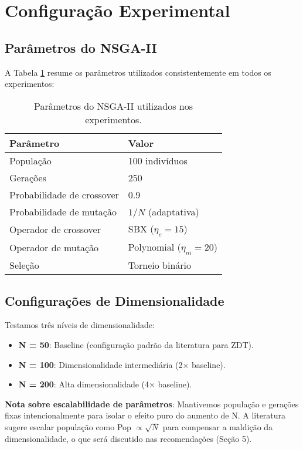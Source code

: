 \section{Configuração Experimental}

\subsection{Parâmetros do NSGA-II}
A Tabela \ref{tab:params} resume os parâmetros utilizados consistentemente em todos os experimentos:

\begin{table}[h]
\centering
\begin{tabular}{ll}
\toprule
\textbf{Parâmetro} & \textbf{Valor} \\
\midrule
População & 100 indivíduos \\
Gerações & 250 \\
Probabilidade de crossover & 0.9 \\
Probabilidade de mutação & $1/N$ (adaptativa) \\
Operador de crossover & SBX ($\eta_c = 15$) \\
Operador de mutação & Polynomial ($\eta_m = 20$) \\
Seleção & Torneio binário \\
\bottomrule
\end{tabular}
\caption{Parâmetros do NSGA-II utilizados nos experimentos.}
\label{tab:params}
\end{table}

\subsection{Configurações de Dimensionalidade}
Testamos três níveis de dimensionalidade:
\begin{itemize}
  \item \textbf{N = 50}: Baseline (configuração padrão da literatura para ZDT).
  \item \textbf{N = 100}: Dimensionalidade intermediária (2× baseline).
  \item \textbf{N = 200}: Alta dimensionalidade (4× baseline).
\end{itemize}

\textbf{Nota sobre escalabilidade de parâmetros}: Mantivemos população e gerações fixas intencionalmente para isolar o efeito puro do aumento de N. A literatura sugere escalar população como Pop $\propto \sqrt{N}$ para compensar a maldição da dimensionalidade, o que será discutido nas recomendações (Seção 5).

